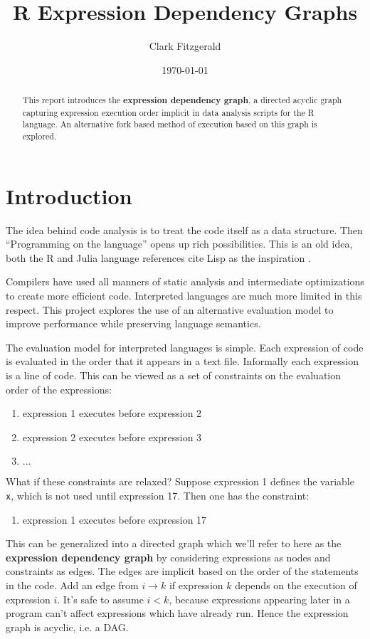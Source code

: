 \documentclass[12pt]{article}
\begin{document}
\title{R Expression Dependency Graphs}
\date{\today}
\author{Clark Fitzgerald}
\maketitle

\begin{abstract}

    This report introduces the \textbf{expression dependency graph}, a
    directed acyclic graph capturing expression execution order implicit in
    data analysis scripts for the R language. An alternative fork based
    method of execution based on this graph is explored.

\end{abstract}

\section{Introduction}

The idea behind code analysis is to treat the code itself as a data
structure. Then ``Programming on the language'' opens up rich possibilities.
This is an old idea, both the R and Julia language references cite Lisp
as the inspiration \cite{Rlang} \cite{bezanson2014julia}.

Compilers have used all manners of static analysis and
intermediate optimizations to create more efficient code. Interpreted
languages are much more limited in this respect. This project explores
the use of an alternative evaluation model to improve performance while
preserving language semantics.

The evaluation model for interpreted languages is simple. Each
expression of code is evaluated in the order that it appears in a text file. Informally
each expression is a line of code. This can be
viewed as a set of constraints on the evaluation order of the expressions:
\begin{enumerate}
    \item expression 1 executes before expression 2
    \item expression 2 executes before expression 3
    \item $\dots$
\end{enumerate}
What if these constraints are relaxed? Suppose expression 1 defines the variable
\texttt{x}, which is not used until expression 17. Then one has the
constraint:
\begin{enumerate}
    \item expression 1 executes before expression 17
\end{enumerate}
This can be generalized into a directed graph which we'll refer to here as
the \textbf{expression dependency graph} by considering expressions as
nodes and constraints as edges. The edges are implicit based on the order
of the statements in the code. Add an edge from $i \rightarrow k$ if
expression $k$ depends on the execution of expression $i$.  It's safe to
assume $i < k$, because expressions appearing later in a program can't
affect expressions which have already run. Hence the expression graph is
acyclic, i.e. a DAG.
\end{document}
